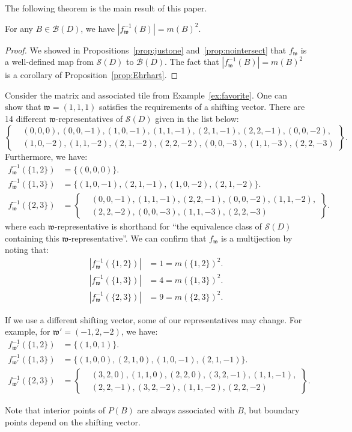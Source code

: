 \documentclass[ALCO,ThmDefs,Unicode,epreuves]{cedram}
\newcommand{\B}{\mathcal{B}}
\newcommand{\Sand}{\mathcal{S}}
\newcommand{\w}{\mathfrak w}
\begin{document}
The following theorem is the main result of this paper.

\begin{theorem}\label{thm:Hellyeah}
For any $B\in \B(D)$, we have $|f_{\w}^{-1}(B)| = m(B)^2$.
\end{theorem}

\begin{proof}
We showed in Propositions~\ref{prop:justone} and~\ref{prop:nointersect} that $f_{\w}$ is a well-defined map from $\Sand(D)$ to $\B(D)$. The fact that $|f_{\w}^{-1}(B)| = m(B)^2$ is a corollary of Proposition~\ref{prop:Ehrhart}.
\end{proof}

\begin{exam}\label{ex:fave2}
Consider the matrix and associated tile from Example~\ref{ex:favorite}. One can show that $\w = (1,1,1)$ satisfies the requirements of a shifting vector. There are 14 different $\w$-representatives of $\Sand(D)$ given in the list below:
\[
\left\{\begin{aligned}
&(0,0,0),(0,0,-1),(1,0,-1),(1,1,-1),(2,1,-1),(2,2,-1),(0,0,-2),\\
&(1,0,-2),(1,1,-2),(2,1,-2),(2,2,-2),(0,0,-3),(1,1,-3),(2,2,-3)
\end{aligned}\right\}.
\]
Furthermore, we have:
\begin{align*}
f_\w^{-1}(\{1,2\}) &= \{(0,0,0)\}.\\
f_\w^{-1}(\{1,3\}) &= \{(1,0,-1),(2,1,-1),(1,0,-2),(2,1,-2)\}.\\
f_\w^{-1}(\{2,3\}) &= \left\{
\begin{aligned}
&(0,0,-1),(1,1,-1),(2,2,-1),(0,0,-2),(1,1,-2),\\
&(2,2,-2),(0,0,-3),(1,1,-3),(2,2,-3)
\end{aligned}
\right\}.
\end{align*}
where each $\w$-representative is shorthand for ``the equivalence class of $\Sand(D)$ containing this $\w$-representative''. We can confirm that $f_{\w}$ is a multijection by noting that:
\begin{align*}
|f_\w^{-1}(\{1,2\})| &= 1 = m(\{1,2\})^2.\\
|f_\w^{-1}(\{1,3\})| &= 4 = m(\{1,3\})^2.\\
|f_\w^{-1}(\{2,3\})| &= 9 = m(\{2,3\})^2.
\end{align*}

If we use a different shifting vector, some of our representatives may change. For example, for $\w' = (-1,2,-2)$, we have:
\begin{align*}
f_{\w'}^{-1}(\{1,2\}) &= \{(1,0,1)\}.\\
f_{\w'}^{-1}(\{1,3\}) &= \{(1,0,0),(2,1,0),(1,0,-1),(2,1,-1)\}.\\
f_{\w'}^{-1}(\{2,3\}) &= \left\{
\begin{aligned}
&(3,2,0),(1,1,0),(2,2,0),(3,2,-1),(1,1,-1),\\
&(2,2,-1),(3,2,-2),(1,1,-2),(2,2,-2)
\end{aligned}
\right\}.
\end{align*}

Note that interior points of $P(B)$ are always associated with $B$, but boundary points depend on the shifting vector. 
\end{exam}
\end{document}
